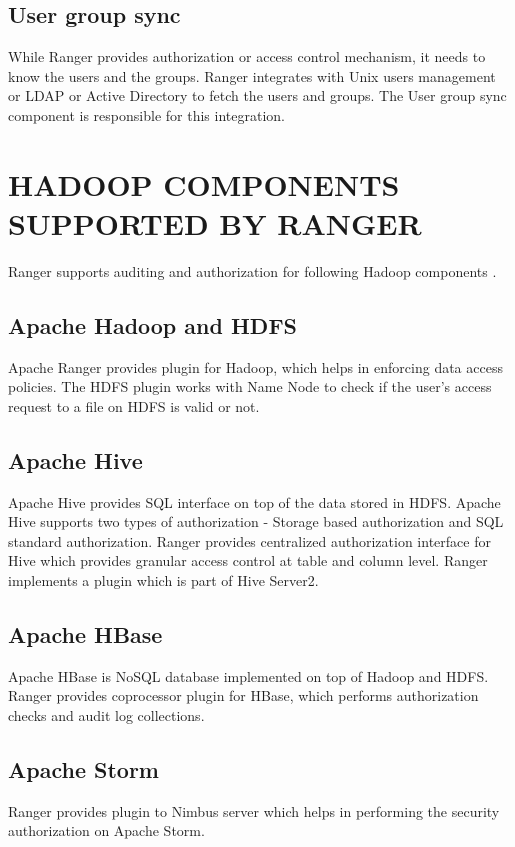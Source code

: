 \documentclass[9pt,twocolumn,twoside]{styles/osajnl}
\begin{document}
\subsection{User group sync}

While Ranger provides authorization or access control mechanism, it needs to
know the users and the groups. Ranger integrates with Unix users management or
LDAP or Active Directory to fetch the users and groups. The User group sync
component is responsible for this integration.

\section{HADOOP COMPONENTS SUPPORTED BY RANGER}

Ranger supports auditing and authorization for following Hadoop components
\cite{www-ranger-faq}.

\subsection{Apache Hadoop and HDFS}

Apache Ranger provides plugin for Hadoop, which helps in enforcing data access
policies. The HDFS plugin works with Name Node to check if the user's access
request to a file on HDFS is valid or not.

\subsection{Apache Hive}

Apache Hive provides SQL interface on top of the data stored in HDFS. Apache
Hive supports two types of authorization - Storage based authorization and
SQL standard authorization. Ranger provides centralized authorization
interface for Hive which provides granular access control at table and column
 level. Ranger implements a plugin which is part of Hive Server2.

\subsection{Apache HBase}
Apache HBase is NoSQL database implemented on top of Hadoop and HDFS. Ranger
provides coprocessor plugin for HBase, which performs authorization checks and
 audit log collections.

\subsection{Apache Storm}
Ranger provides plugin to Nimbus server which helps in performing the
security authorization on Apache Storm.
\end{document}
